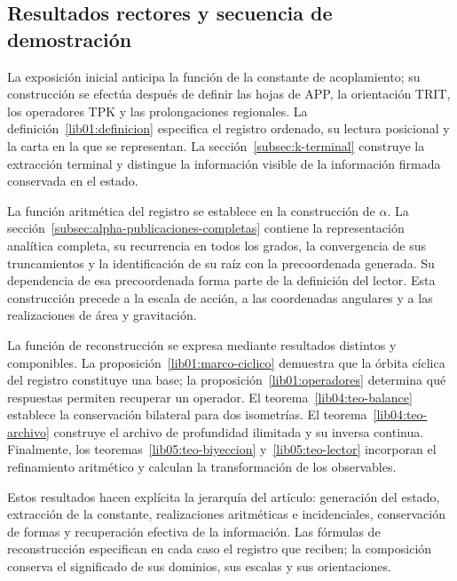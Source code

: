\subsection*{Resultados rectores y secuencia de demostración}
\label{paper:resultados-rectores}
La exposición inicial anticipa la función de la constante de acoplamiento;
su construcción se efectúa después de definir las hojas de APP, la
orientación TRIT, los operadores TPK y las prolongaciones regionales.
La definición~\ref{lib01:definicion} especifica el registro ordenado, su
lectura posicional y la carta en la que se representan. La
sección~\ref{subsec:k-terminal} construye la extracción terminal y distingue
la información visible de la información firmada conservada en el estado.

La función aritmética del registro se establece en la construcción de
\(\alpha\). La sección~\ref{subsec:alpha-publicaciones-completas} contiene
la representación analítica completa, su recurrencia en todos los grados,
la convergencia de sus truncamientos y la identificación de su raíz con la
precoordenada generada. Su dependencia de esa precoordenada forma parte de
la definición del lector. Esta construcción precede a la escala de acción,
a las coordenadas angulares y a las realizaciones de área y gravitación.

La función de reconstrucción se expresa mediante resultados distintos y
componibles. La proposición~\ref{lib01:marco-ciclico} demuestra que la
órbita cíclica del registro constituye una base; la
proposición~\ref{lib01:operadores} determina qué respuestas permiten
recuperar un operador. El teorema~\ref{lib04:teo-balance} establece la
conservación bilateral para dos isometrías. El
teorema~\ref{lib04:teo-archivo} construye el archivo de profundidad
ilimitada y su inversa continua. Finalmente, los
teoremas~\ref{lib05:teo-biyeccion} y~\ref{lib05:teo-lector} incorporan
el refinamiento aritmético y calculan la transformación de los observables.

Estos resultados hacen explícita la jerarquía del artículo: generación del
estado, extracción de la constante, realizaciones aritméticas e
incidenciales, conservación de formas y recuperación efectiva de la
información. Las fórmulas de reconstrucción especifican en cada caso el
registro que reciben; la composición conserva el significado de sus
dominios, sus escalas y sus orientaciones.
